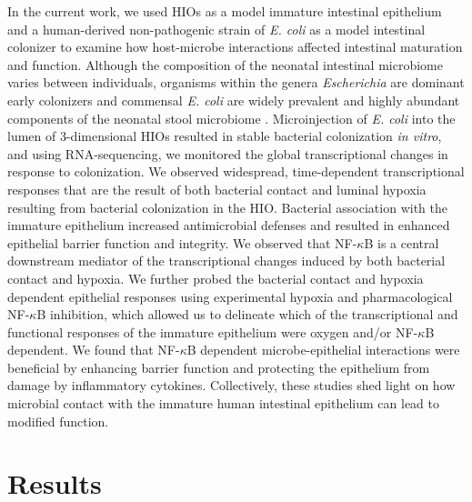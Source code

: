 \documentclass[9pt,lineo]{elife}
\begin{document}
In the current work, we used HIOs as a model immature intestinal epithelium and a human-derived non-pathogenic strain of \emph{E. coli} as a model intestinal colonizer to examine how host-microbe interactions affected intestinal maturation and function.  Although the composition of the neonatal intestinal microbiome varies between individuals, organisms within the genera \emph{Escherichia} are dominant early colonizers \citep{Gosalbes:2013,Backhed:2015} and commensal \emph{E. coli} are widely prevalent and highly abundant components of the neonatal stool microbiome \citep{Palmer:2007,Koenig:2011,Backhed:2015,Morrow:2013}. Microinjection of \emph{E. coli} into the lumen of 3-dimensional HIOs resulted in stable bacterial colonization \emph{in vitro}, and using RNA-sequencing, we monitored the global transcriptional changes in response to colonization. We observed widespread, time-dependent transcriptional responses that are the result of both bacterial contact and luminal hypoxia resulting from bacterial colonization in the HIO. Bacterial association with the immature epithelium increased antimicrobial defenses and resulted in enhanced epithelial barrier function and integrity. We observed that NF-\(\kappa\)B is a central downstream mediator of the transcriptional changes induced by both bacterial contact and hypoxia. We further probed the bacterial contact and hypoxia dependent epithelial responses using experimental hypoxia and pharmacological NF-\(\kappa\)B inhibition, which allowed us to delineate which of the transcriptional and functional responses of the immature epithelium were oxygen and/or NF-\(\kappa\)B dependent. We found that NF-\(\kappa\)B dependent microbe-epithelial interactions were beneficial by enhancing barrier function and protecting the epithelium from damage by inflammatory cytokines.  Collectively, these studies shed light on how microbial contact with the immature human intestinal epithelium can lead to modified function.

\section*{{\bfseries\sffamily } Results}
\label{sec:orgheadline12}
\end{document}
